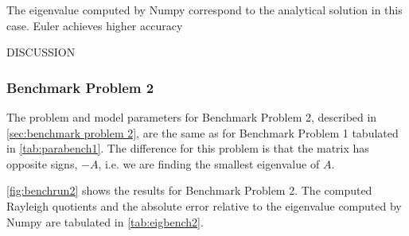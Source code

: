 The eigenvalue computed by Numpy correspond to the analytical solution in this case. Euler achieves higher accuracy

DISCUSSION

\subsubsection{Benchmark Problem 2}

The problem and model parameters for Benchmark Problem 2, described in \autoref{sec:benchmark problem 2}, are the same as for Benchmark Problem 1 tabulated in \autoref{tab:parabench1}. The difference for this problem is that the matrix has opposite signs, $-A$, i.e. we are finding the smallest eigenvalue of $A$.

\autoref{fig:benchrun2} shows the results for Benchmark Problem 2. The computed Rayleigh quotients and the absolute error relative to the eigenvalue computed by Numpy are tabulated in \autoref{tab:eigbench2}. 

